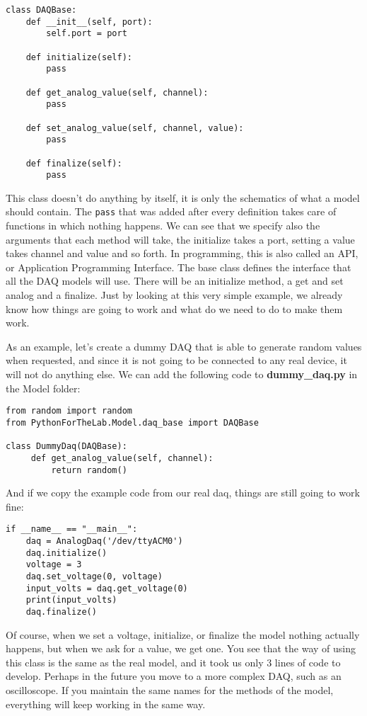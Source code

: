 \begin{verbatim}
class DAQBase:
    def __init__(self, port):
        self.port = port

    def initialize(self):
        pass

    def get_analog_value(self, channel):
        pass

    def set_analog_value(self, channel, value):
        pass

    def finalize(self):
        pass
\end{verbatim}

This class doesn't do anything by itself, it is only the schematics of what a model should contain. The \texttt{pass} that was added after every definition takes care of functions in which nothing happens. We can see that we specify also the arguments that each method will take, the initialize takes a port, setting a value takes channel and value and so forth. In programming, this is also called an API, or Application Programming Interface. The base class defines the interface that all the DAQ models will use. There will be an initialize method, a get and set analog and a finalize. Just by looking at this very simple example, we already know how things are going to work and what do we need to do to make them work.

As an example, let's create a dummy DAQ that is able to generate random values when requested, and since it is not going to be connected to any real device, it will not do anything else. We can add the following code to \textbf{dummy\_daq.py} in the Model folder:

\begin{verbatim}
from random import random
from PythonForTheLab.Model.daq_base import DAQBase

class DummyDaq(DAQBase):
     def get_analog_value(self, channel):
         return random()
\end{verbatim}

And if we copy the example code from our real daq, things are still going to work fine:

\begin{verbatim}
if __name__ == "__main__":
    daq = AnalogDaq('/dev/ttyACM0')
    daq.initialize()
    voltage = 3
    daq.set_voltage(0, voltage)
    input_volts = daq.get_voltage(0)
    print(input_volts)
    daq.finalize()
\end{verbatim}

Of course, when we set a voltage, initialize, or finalize the model nothing actually happens, but when we ask for a value, we get one. You see that the way of using this class is the same as the real model, and it took us only 3 lines of code to develop. Perhaps in the future you move to a more complex DAQ, such as an oscilloscope. If you maintain the same names for the methods of the model, everything will keep working in the same way.

